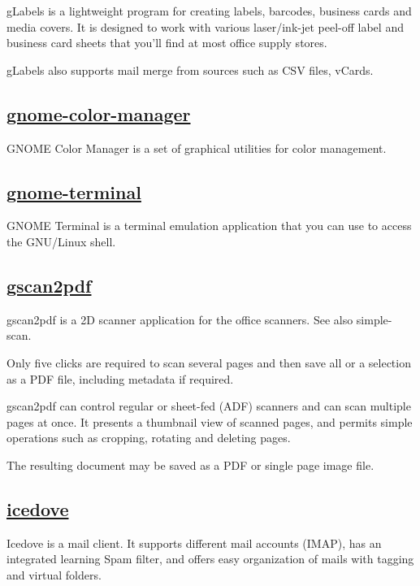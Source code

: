  gLabels is a lightweight program for creating labels, barcodes, business
 cards and media covers. It is designed to
 work with various laser/ink-jet peel-off label and business card sheets that
 you'll find at most office supply stores.
 
 gLabels also supports mail merge from sources such as CSV files, vCards.

\subsection{\href{https://git.gnome.org/browse/gnome-color-manager}{gnome-color-manager}}

 GNOME Color Manager is a set of graphical utilities for color
 management.

\subsection{\href{}{gnome-terminal}}

 GNOME Terminal is a terminal emulation application that you can use to
 access the GNU/Linux shell.

\subsection{\href{http://gscan2pdf.sourceforge.net/}{gscan2pdf}}

gscan2pdf is a 2D scanner application for the office scanners. See also
simple-scan.

 Only five clicks are required to scan several pages and then save all or a
 selection as a PDF file, including metadata if required.
 
 gscan2pdf can control regular or sheet-fed (ADF) scanners
 and can scan multiple pages at once.
 It presents a thumbnail view of scanned pages, and permits simple operations
 such as cropping, rotating and deleting pages.
 
 The resulting document may be saved as a PDF or
 single page image file.

\subsection{\href{http://www.mozilla.org/thunderbird/}{icedove}}

 Icedove is a mail client.
 It supports different mail accounts (IMAP), has an
 integrated learning Spam filter, and offers easy organization of mails with
 tagging and virtual folders.
 
